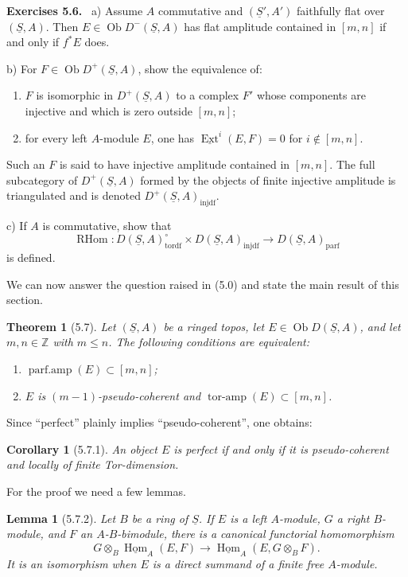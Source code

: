 \documentclass[11pt]{article}
\theoremstyle{plain}
\newtheorem*{theorem*}{Theorem}
\newtheorem*{lemma*}{Lemma}
\newtheorem*{corollary*}{Corollary}
\theoremstyle{definition}
\theoremstyle{remark}
\newenvironment{statement}[1]{\par\medskip\noindent\textbf{#1.}\ }{\par\medskip}
\newcommand{\ZZ}{\mathbb Z}
\DeclareMathOperator{\Hom}{Hom}
\DeclareMathOperator{\Ext}{Ext}
\DeclareMathOperator{\ob}{Ob}
\DeclareMathOperator{\RHom}{RHom}
\providecommand{\uS}{\underline{S}}
\begin{document}
\begin{statement}{Exercises 5.6}
\textup{a)} Assume $A$ commutative and $(\uS',A')$ faithfully flat over $(\uS,A)$. Then $E\in\ob D^-(\uS,A)$ has flat amplitude contained in $[m,n]$ if and only if $f^*E$ does.

\textup{b)} For $F\in\ob D^+(\uS,A)$, show the equivalence of:
\begin{enumerate}[label=(\roman*)]
\item $F$ is isomorphic in $D^+(\uS,A)$ to a complex $F'$ whose components are injective and which is zero outside $[m,n]$;
\item for every left $A$-module $E$, one has $\underline{\Ext}^i(E,F)=0$ for $i\notin[m,n]$.
\end{enumerate}
Such an $F$ is said to have injective amplitude contained in $[m,n]$. The full subcategory of $D^+(\uS,A)$ formed by the objects of finite injective amplitude is triangulated and is denoted $D^+(\uS,A)_{\mathrm{injdf}}$.

\textup{c)} If $A$ is commutative, show that
\[
\RHom:D(\uS,A)_{\mathrm{tordf}}^\circ\times
D(\uS,A)_{\mathrm{injdf}}
\longrightarrow D(\uS,A)_{\mathrm{parf}}
\]
is defined.
\end{statement}

We can now answer the question raised in (5.0) and state the main result of this section.

\begin{theorem*}[5.7]
Let $(\uS,A)$ be a ringed topos, let $E\in\ob D(\uS,A)$, and let $m,n\in\ZZ$ with $m\leq n$. The following conditions are equivalent:
\begin{enumerate}[label=(\roman*)]
\item $\operatorname{parf.amp}(E)\subset[m,n]$;
\item $E$ is $(m-1)$-pseudo-coherent and $\operatorname{tor\text{-}amp}(E)\subset[m,n]$.
\end{enumerate}
\end{theorem*}

Since ``perfect'' plainly implies ``pseudo-coherent'', one obtains:

\begin{corollary*}[5.7.1]
An object $E$ is perfect if and only if it is pseudo-coherent and locally of finite Tor-dimension.
\end{corollary*}

For the proof we need a few lemmas.

\begin{lemma*}[5.7.2]
Let $B$ be a ring of $\uS$. If $E$ is a left $A$-module, $G$ a right $B$-module, and $F$ an $A$-$B$-bimodule, there is a canonical functorial homomorphism
\[
G\otimes_B\underline{\Hom}_A(E,F)
\longrightarrow
\underline{\Hom}_A(E,G\otimes_BF).
\]
It is an isomorphism when $E$ is a direct summand of a finite free $A$-module.
\end{lemma*}
\end{document}
